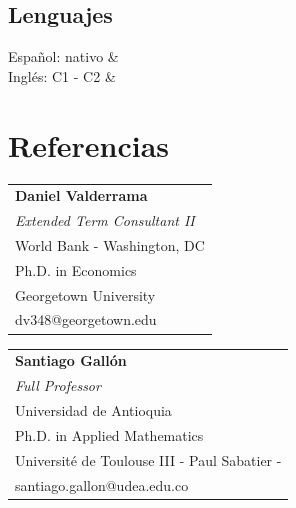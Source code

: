 \documentclass[a3paper,11pt]{article}
\begin{document}
\begin{adjustbox}{valign=t}
\begin{minipage}{0.6\textwidth}
\begin{multicols}{2}
\section*{Lenguajes}
\begin{tblr}{
}
	Español: nativo & \\
	Inglés: C1 - C2 &  \\
\end{tblr}
\end{multicols}
\section*{Referencias}

\begin{multicols}{2}

\raggedright
\begin{tabular}{l}
\textbf{Daniel Valderrama}  \\
\textit{Extended Term Consultant II} \\
World Bank - Washington, DC\\
Ph.D. in Economics \\
Georgetown University\\
dv348@georgetown.edu

\end{tabular}

\vfill\null \columnbreak  %

\begin{tabular}{l}
\textbf{Santiago Gallón} \\
\textit{Full Professor} \\
Universidad de Antioquia\\
Ph.D. in Applied Mathematics \\
Université de Toulouse III - Paul Sabatier -\\
santiago.gallon@udea.edu.co
\end{tabular}
\end{multicols}
\LastUpdate
\end{minipage}
\end{adjustbox}
\end{document}
